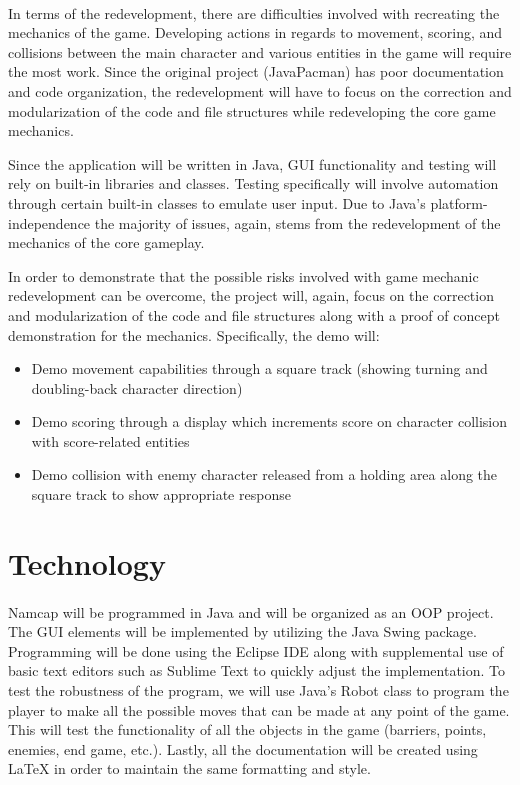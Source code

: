 \documentclass{article}
\begin{document}
\paragraph{}
In terms of the redevelopment, there are difficulties involved with recreating the mechanics of the game. Developing actions in regards to movement, scoring, and collisions between the main character and various entities in the game will require the most work. Since the original project (JavaPacman) has poor documentation and code organization, the redevelopment will have to focus on the correction and modularization of the code and file structures while redeveloping the core game mechanics.\par Since the application will be written in Java, GUI functionality and testing will rely on built-in libraries and classes. Testing specifically will involve automation through certain built-in classes to emulate user input. Due to Java's platform-independence the majority of issues, again, stems from the redevelopment of the mechanics of the core gameplay.\par In order to demonstrate that the possible risks involved with game mechanic redevelopment can be overcome, the project will, again, focus on the correction and modularization of the code and file structures along with a proof of concept demonstration for the mechanics. Specifically, the demo will:
\begin{itemize}
\item Demo movement capabilities through a square track (showing turning and doubling-back character direction)
\item Demo scoring through a display which increments score on character collision with score-related entities
\item Demo collision with enemy character released from a holding area along the square track to show appropriate response
\end{itemize}   

\section{Technology}

\paragraph{}
Namcap will be programmed in Java and will be organized as an OOP project. The GUI elements will be implemented by utilizing the Java Swing package. Programming will be done using the Eclipse IDE along with supplemental use of basic text editors such as Sublime Text to quickly adjust the implementation. To test the robustness of the program, we will use Java's Robot class to program the player to make all the possible moves that can be made at any point of the game. This will test the functionality of all the objects in the game (barriers, points, enemies, end game, etc.). Lastly, all the documentation will be created using LaTeX in order to maintain the same formatting and style.
\end{document}
